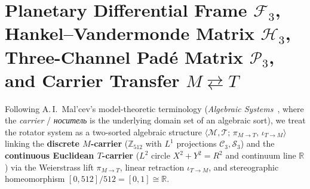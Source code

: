 \documentclass[11pt,a4paper]{article}
\theoremstyle{plain}
\theoremstyle{definition}
\begin{document}
\section{Planetary Differential Frame \texorpdfstring{$\mathcal{F}_3$}{F3}, Hankel--Vandermonde Matrix \texorpdfstring{$\mathcal{H}_3$}{H3}, Three-Channel Pad\'e Matrix \texorpdfstring{$\mathcal{P}_3$}{P3}, and Carrier Transfer \texorpdfstring{$M\rightleftarrows T$}{M <-> T}}
\label{sec:planetary-frame}

Following A.\,I.~Mal'cev's model-theoretic terminology (\emph{Algebraic Systems}~\cite{Malcev1973}, where the \emph{carrier} / \emph{носитель} is the underlying domain set of an algebraic sort), we treat the rotator system as a two-sorted algebraic structure $\langle\mathcal{M},\mathcal{T};\,\pi_{M\to T},\,\iota_{T\to M}\rangle$ linking the \textbf{discrete $M$-carrier} ($\mathbb{Z}_{512}$ with $L^1$ projections $\mathcal{C}_3,\mathcal{S}_3$) and the \textbf{continuous Euclidean $T$-carrier} ($L^2$ circle $X^2+Y^2=R^2$ and continuum line $\mathbb{R}$) via the Weierstrass lift $\pi_{M\to T}$, linear retraction $\iota_{T\to M}$, and stereographic homeomorphism $[0,512]/512 = [0,1]\cong\mathbb{R}$.
\end{document}
